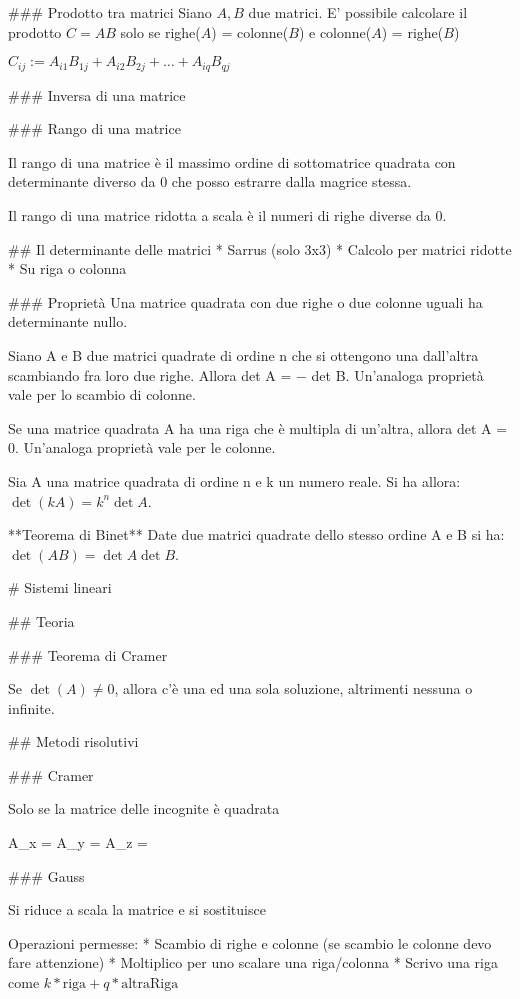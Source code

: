 ### Prodotto tra matrici
Siano $A, B$ due matrici. E' possibile calcolare il prodotto $C=AB$ solo se righe($A$) = colonne($B$) e colonne($A$) = righe($B$)

$C_{ij} := A_{i1}B_{1j} + A_{i2}B_{2j} + \ldots + A_{iq}B_{qj}$


### Inversa di una matrice

### Rango di una matrice

Il rango di una matrice è il massimo ordine di sottomatrice quadrata con determinante diverso da 0 che posso estrarre dalla magrice stessa.

Il rango di una matrice ridotta a scala è il numeri di righe diverse da 0.


## Il determinante delle matrici
* Sarrus (solo 3x3)
* Calcolo per matrici ridotte
    * Su riga o colonna

### Proprietà
Una matrice quadrata con due righe o due colonne uguali ha determinante nullo.

Siano A e B due matrici quadrate di ordine n che si ottengono una dall’altra scambiando fra loro due righe. Allora det A = − det B. Un’analoga proprietà vale per lo scambio di colonne.

Se una matrice quadrata A ha una riga che è multipla di un’altra, allora det A = 0. Un’analoga proprietà vale per le colonne.

Sia A una matrice quadrata di ordine n e k un numero reale. Si ha allora: $\det (kA) = k^n \det A$.

**Teorema di Binet** Date due matrici quadrate dello stesso ordine A e B si ha: $\det(AB) = \det A \det B$.


# Sistemi lineari

## Teoria

### Teorema di Cramer

Se $\det(A) \ne 0$, allora c'è una ed una sola soluzione, altrimenti nessuna o infinite.

## Metodi risolutivi

### Cramer

Solo se la matrice delle incognite è quadrata

A_x = 
A_y = 
A_z = 

### Gauss

Si riduce a scala la matrice e si sostituisce

Operazioni permesse: 
* Scambio di righe e colonne (se scambio le colonne devo fare attenzione)
* Moltiplico per uno scalare una riga/colonna
* Scrivo una riga come $k * \text{riga} + q * \text{altraRiga}$

